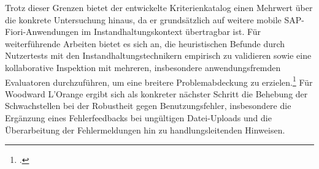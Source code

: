 Trotz dieser Grenzen bietet der entwickelte Kriterienkatalog einen Mehrwert über die konkrete Untersuchung hinaus, da er grundsätzlich auf weitere mobile SAP-Fiori-Anwendungen im Instandhaltungskontext übertragbar ist.
Für weiterführende Arbeiten bietet es sich an, die heuristischen Befunde durch Nutzertests mit den Instandhaltungstechnikern empirisch zu validieren sowie eine kollaborative Inspektion mit mehreren, insbesondere anwendungsfremden Evaluatoren durchzuführen, um eine breitere Problemabdeckung zu erzielen.\footcite[Vgl.][S.~363]{inal2021collaborative}
Für Woodward L'Orange ergibt sich als konkreter nächster Schritt die Behebung der Schwachstellen bei der Robustheit gegen Benutzungsfehler, insbesondere die Ergänzung eines Fehlerfeedbacks bei ungültigen Datei-Uploads und die Überarbeitung der Fehlermeldungen hin zu handlungsleitenden Hinweisen.
